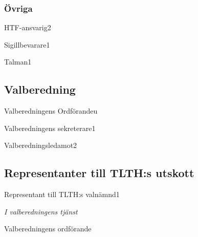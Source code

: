\documentclass[10pt]{article}
\begin{document}
\subsubsection{Övriga}
\begin{vallista}
    \begin{post}{HTF-ansvarig}{2}
    \end{post}
    \begin{post}{Sigillbevarare}{1}
    \end{post}
    \begin{post}{Talman}{1}
    \end{post}
\end{vallista}

\subsection{Valberedning}
\begin{vallista}
    \begin{post}{Valberedningens Ordförande}{u}
    \end{post}
    \begin{post}{Valberedningens sekreterare}{1}
    \end{post}
    \begin{post}{Valberedningsledamot}{2}
    \end{post}
\end{vallista}

\subsection{Representanter till TLTH:s utskott}
\begin{vallista}
    \begin{post}{Representant till TLTH:s valnämnd}{1}
        \vakant
    \end{post}
\end{vallista}

\begin{signatures}{1}
\emph{I valberedningens tjänst}
\signature{Christian Benson}{Valberedningens ordförande}
\end{signatures}
\end{document}
